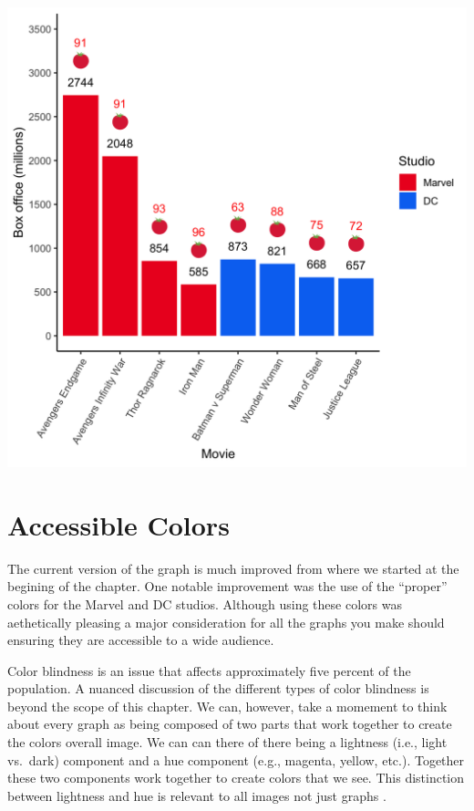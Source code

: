 \documentclass[
]{krantz}
\begin{document}
\includegraphics[width=0.85\linewidth]{ch_graphing/images/emoji_graph}

\hypertarget{accessible-colors}{%
\section{Accessible Colors}\label{accessible-colors}}

The current version of the graph is much improved from where we started at the begining of the chapter. One notable improvement was the use of the ``proper'' colors for the Marvel and DC studios. Although using these colors was aethetically pleasing a major consideration for all the graphs you make should ensuring they are accessible to a wide audience.

Color blindness is an issue that affects approximately five percent of the population. A nuanced discussion of the different types of color blindness is beyond the scope of this chapter. We can, however, take a momement to think about every graph as being composed of two parts that work together to create the colors overall image. We can can there of there being a lightness (i.e., light vs.~dark) component and a hue component (e.g., magenta, yellow, etc.). Together these two components work together to create colors that we see. This distinction between lightness and hue is relevant to all images not just graphs \citep[see][]{margulis2005photoshop}.
\end{document}
